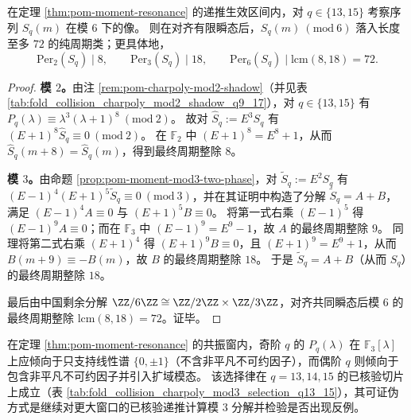 \begin{corollary}\label{cor:pom-mod6-period-collapse-72-q13-15}
在定理 \ref{thm:pom-moment-resonance} 的递推生效区间内，对 \(q\in\{13,15\}\) 考察序列 \(S_q(m)\) 在模 \(6\) 下的像。
则在对齐有限瞬态后，\(S_q(m)\ (\mathrm{mod}\ 6)\) 落入长度至多 \(72\) 的纯周期类；更具体地，
\[
\mathrm{Per}_2(S_q)\mid 8,\qquad \mathrm{Per}_3(S_q)\mid 18,\qquad \mathrm{Per}_6(S_q)\mid \mathrm{lcm}(8,18)=72.
\]
\end{corollary}
\begin{proof}
\textbf{模 \(2\)。}由注 \ref{rem:pom-charpoly-mod2-shadow}（并见表 \ref{tab:fold_collision_charpoly_mod2_shadow_q9_17}），对 \(q\in\{13,15\}\) 有
\(
P_q(\lambda)\equiv \lambda^3(\lambda+1)^8\ (\mathrm{mod}\ 2)
\)。
故对 \(\widehat S_q:=E^3S_q\) 有 \((E+1)^8\widehat S_q\equiv 0\ (\mathrm{mod}\ 2)\)。
在 \(\mathbb{F}_2\) 中 \((E+1)^8=E^8+1\)，从而 \(\widehat S_q(m+8)=\widehat S_q(m)\)，得到最终周期整除 \(8\)。
\par
\textbf{模 \(3\)。}由命题 \ref{prop:pom-moment-mod3-two-phase}，对 \(\widetilde S_q:=E^2S_q\) 有
\(
(E-1)^4(E+1)^5\widetilde S_q\equiv 0\ (\mathrm{mod}\ 3)
\)，并在其证明中构造了分解 \(\widetilde S_q=A+B\)，满足
\(
(E-1)^4A\equiv 0
\)
与
\(
(E+1)^5B\equiv 0
\)。
将第一式右乘 \((E-1)^5\) 得 \((E-1)^9A\equiv 0\)；而在 \(\mathbb{F}_3\) 中 \((E-1)^9=E^9-1\)，故 \(A\) 的最终周期整除 \(9\)。
同理将第二式右乘 \((E+1)^4\) 得 \((E+1)^9B\equiv 0\)，且 \((E+1)^9=E^9+1\)，从而 \(B(m+9)\equiv -B(m)\)，故 \(B\) 的最终周期整除 \(18\)。
于是 \(\widetilde S_q=A+B\)（从而 \(S_q\)）的最终周期整除 \(18\)。
\par
最后由中国剩余分解 \(\ZZ/6\ZZ\cong \ZZ/2\ZZ\times \ZZ/3\ZZ\)，对齐共同瞬态后模 \(6\) 的最终周期整除 \(\mathrm{lcm}(8,18)=72\)。证毕。
\end{proof}

\begin{conjecture}\label{conj:pom-charpoly-mod3-odd-even}
在定理 \ref{thm:pom-moment-resonance} 的共振窗内，奇阶 \(q\) 的 \(P_q(\lambda)\) 在 \(\mathbb{F}_3[\lambda]\) 上应倾向于只支持线性谱 \(\{0,\pm 1\}\)（不含非平凡不可约因子），而偶阶 \(q\) 则倾向于包含非平凡不可约因子并引入扩域模态。
该选择律在 \(q=13,14,15\) 的已核验切片上成立（表 \ref{tab:fold_collision_charpoly_mod3_selection_q13_15}），其可证伪方式是继续对更大窗口的已核验递推计算模 \(3\) 分解并检验是否出现反例。
\end{conjecture}

